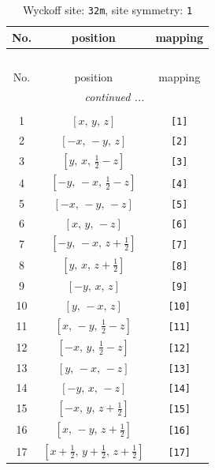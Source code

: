 \documentclass[fleqn,8pt]{jsarticle}
\begin{document}
\renewcommand{\arraystretch}{1.2}
\begin{longtable}{ccc}
\caption{Wyckoff site: {\tt 32m}, site symmetry: {\tt 1}}
 \\
 \hline \hline
No. & position & mapping \\ \hline \endfirsthead

\multicolumn{2}{l}{\tablename\ \thetable{}} \\
 \hline \hline
No. & position & mapping \\ \hline \endhead

 \hline \hline
\multicolumn{2}{r}{\footnotesize\it continued ...} \\ \endfoot

 \hline \hline
\multicolumn{2}{r}{} \\ \endlastfoot

1 & $\left[ x,\, y,\, z \right]$ & {\tt [1]} \\ \hline
2 & $\left[ - x,\, - y,\, z \right]$ & {\tt [2]} \\ \hline
3 & $\left[ y,\, x,\, \frac{1}{2} - z \right]$ & {\tt [3]} \\ \hline
4 & $\left[ - y,\, - x,\, \frac{1}{2} - z \right]$ & {\tt [4]} \\ \hline
5 & $\left[ - x,\, - y,\, - z \right]$ & {\tt [5]} \\ \hline
6 & $\left[ x,\, y,\, - z \right]$ & {\tt [6]} \\ \hline
7 & $\left[ - y,\, - x,\, z + \frac{1}{2} \right]$ & {\tt [7]} \\ \hline
8 & $\left[ y,\, x,\, z + \frac{1}{2} \right]$ & {\tt [8]} \\ \hline
9 & $\left[ - y,\, x,\, z \right]$ & {\tt [9]} \\ \hline
10 & $\left[ y,\, - x,\, z \right]$ & {\tt [10]} \\ \hline
11 & $\left[ x,\, - y,\, \frac{1}{2} - z \right]$ & {\tt [11]} \\ \hline
12 & $\left[ - x,\, y,\, \frac{1}{2} - z \right]$ & {\tt [12]} \\ \hline
13 & $\left[ y,\, - x,\, - z \right]$ & {\tt [13]} \\ \hline
14 & $\left[ - y,\, x,\, - z \right]$ & {\tt [14]} \\ \hline
15 & $\left[ - x,\, y,\, z + \frac{1}{2} \right]$ & {\tt [15]} \\ \hline
16 & $\left[ x,\, - y,\, z + \frac{1}{2} \right]$ & {\tt [16]} \\ \hline
17 & $\left[ x + \frac{1}{2},\, y + \frac{1}{2},\, z + \frac{1}{2} \right]$ & {\tt [17]} \\ \hline

\end{longtable}
\end{document}

